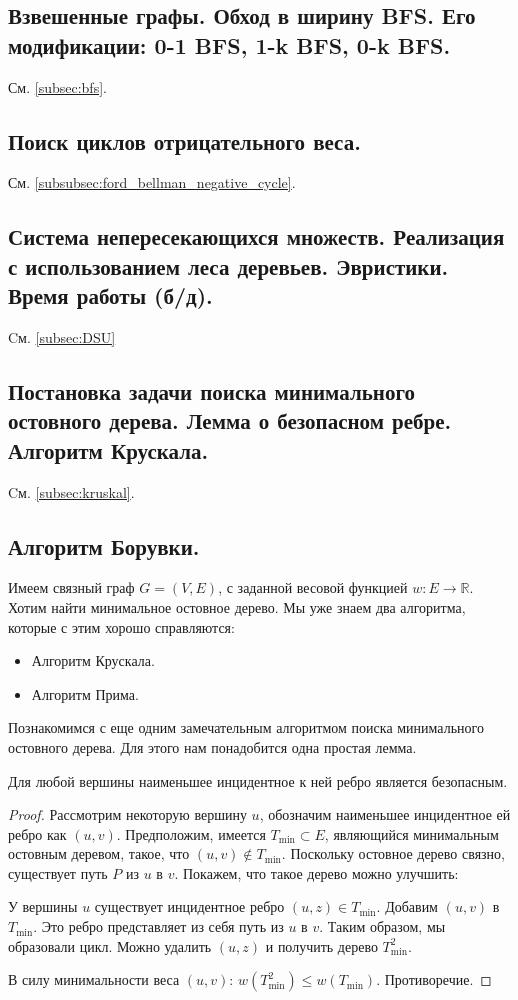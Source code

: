 \documentclass[a4paper,14pt]{article}
\begin{document}
    \subsection{Взвешенные графы. Обход в ширину BFS. Его модификации: 0-1 BFS, 1-k BFS, 0-k BFS.}
    См. \ref{subsec:bfs}.
    \subsection{Поиск циклов отрицательного веса.}
    См. \ref{subsubsec:ford_bellman_negative_cycle}.
    \subsection{Система непересекающихся множеств. Реализация с использованием леса деревьев. Эвристики. Время работы (б/д).}
    Cм. \ref{subsec:DSU}
    \subsection{Постановка задачи поиска минимального остовного дерева. Лемма о безопасном ребре. Алгоритм Крускала.}
    Cм. \ref{subsec:kruskal}.
    \subsection{Алгоритм Борувки.}
        Имеем связный граф $G = (V,E)$, с заданной весовой функцией
    $w : E \rightarrow \mathbb{R}$. Хотим найти минимальное остовное дерево. Мы уже
    знаем два алгоритма, которые с этим хорошо справляются:
    \begin{itemize}
        \item Алгоритм Крускала.
        \item Алгоритм Прима.
    \end{itemize}
    Познакомимся с еще одним замечательным алгоритмом поиска
    минимального остовного дерева. Для этого нам понадобится одна
    простая лемма.
    \begin{lemma}
        Для любой вершины наименьшее инцидентное к ней ребро является безопасным.
    \end{lemma}
    \begin{proof}
        Рассмотрим некоторую вершину $u$, обозначим наименьшее инцидентное ей ребро как $(u, v)$. Предположим, имеется $T_{\text{min}} \subset E$, являющийся минимальным остовным деревом, такое, что $(u, v) \notin T_{\text{min}}$. Поскольку остовное дерево связно, существует путь $P$ из $u$ в $v$. Покажем, что такое дерево можно улучшить:

У вершины $u$ существует инцидентное ребро $(u, z) \in T_{\text{min}}$. Добавим $(u, v)$ в $T_{\text{min}}$. Это ребро представляет из себя путь из $u$ в $v$. Таким образом, мы образовали цикл. Можно удалить $(u, z)$ и получить дерево $T_{\text{min}}^2$.

В силу минимальности веса $(u, v)$: $w(T_{\text{min}}^2) \leq w(T_{\text{min}})$. Противоречие.

    \end{proof}
\end{document}
